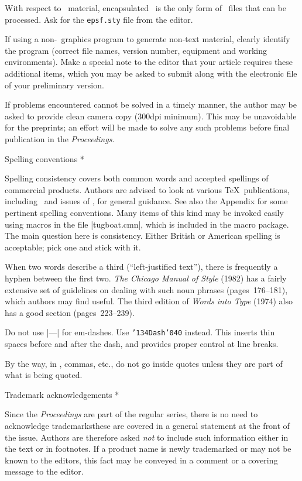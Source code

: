 With respect to \PS\ material, encapsulated \PS\ is the only form of
\PS\ files that can be processed.  Ask for the {\tt epsf.sty} file from
the editor.
 
If using a non-\PS\ graphics program to generate non-text material,
clearly identify the program (correct file names, version number,
equipment and working environments).  Make a special note to the editor
that your article requires these additional items, which you may be
asked to submit along with the electronic file of your preliminary
version.
 
If problems encountered cannot be solved in a timely manner, the author
may be asked to provide clean camera copy (300dpi minimum).  This may be
unavoidable for the preprints; an effort will be made to solve any such
problems before final publication in the {\sl Proceedings}.
 
\subhead * Spelling conventions *
 
Spelling consistency covers both common words and accepted spellings of
commercial products.  Authors are advised to look at various \TeX\
publications, including \TB\ and issues of \TUB, for general guidance.
See also the Appendix for some pertinent spelling conventions.  Many
items of this kind may be invoked easily using macros in the file
|tugboat.cmn|, which is included in the macro package.  The main
question here is consistency.  Either British or American spelling is
acceptable; pick one and stick with it.
 
When two words describe a third (``left-justified text''), there is
frequently a hyphen between the first two.  {\sl The Chicago Manual of
Style\/} (1982) has a fairly extensive set of guidelines on dealing with
such noun phrases (pages~176--181), which authors may find useful.
The third edition of {\sl Words into Type\/} (1974) also has a good
section (pages~223--239).
 
Do not use |---| for em-dashes.  Use {\tt\char'134{Dash}\char'040}
instead.  This inserts thin spaces before and after the dash, and
provides proper control at line breaks.
 
By the way, in \TUB, commas, etc., do not go inside quotes unless they
are part of what is being quoted.
 
\subhead * Trademark acknowledgements *
 
Since the {\sl Proceedings\/} are part of the regular \TUB\/ series,
there is no need to acknowledge trademarks\Dash these are covered in a
general statement at the front of the issue.  Authors are therefore
asked {\it not\/} to include such information either in the text or in
footnotes.  If a product name is newly trademarked or may not be known
to the editors, this fact may be conveyed in a comment or a covering
message to the editor.
 
